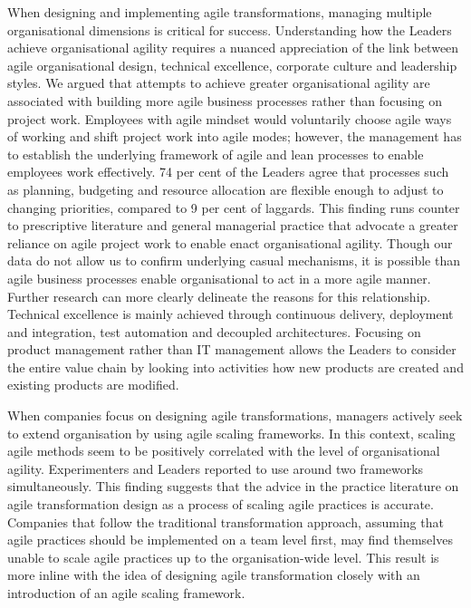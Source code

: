 \documentclass{article}
\begin{document}
When designing and implementing agile transformations, managing multiple organisational dimensions is critical for success. Understanding how the Leaders achieve organisational agility requires a nuanced appreciation of the link between agile organisational design, technical excellence, corporate culture and leadership styles. We argued that attempts to achieve greater organisational agility are associated with building more agile business processes rather than focusing on project work. Employees with agile mindset would voluntarily choose agile ways of working and shift project work into agile modes; however, the management has to establish the underlying framework of agile and lean processes to enable employees work effectively. 74 per cent of the Leaders agree that processes such as planning, budgeting and resource allocation are flexible enough to adjust to changing priorities, compared to 9 per cent of laggards. This finding runs counter to prescriptive literature and general managerial practice that advocate a greater reliance on agile project work to enable enact organisational agility. Though our data do not allow us to confirm underlying casual mechanisms, it is possible than agile business processes enable organisational to act in a more agile manner. Further research can more clearly delineate the reasons for this relationship. Technical excellence is mainly achieved through continuous delivery, deployment and integration, test automation and decoupled architectures. Focusing on product management rather than IT management allows the Leaders to consider the entire value chain by looking into activities how new products are created and existing products are modified.

When companies focus on designing agile transformations, managers actively seek to extend organisation by using agile scaling frameworks. In this context, scaling agile methods seem to be positively correlated with the level of organisational agility. Experimenters and Leaders reported to use around two frameworks simultaneously. This finding suggests that the advice in the practice literature on agile transformation design as a process of scaling agile practices is accurate. Companies that follow the traditional transformation approach, assuming that agile practices should be implemented on a team level first, may find themselves unable to scale agile practices up to the organisation-wide level. This result is more inline with the idea of designing agile transformation closely with an introduction of an agile scaling framework.
\end{document}
